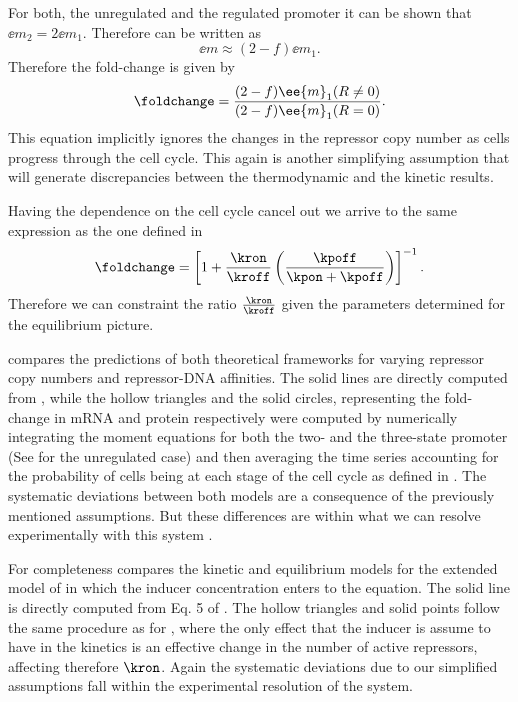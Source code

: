 For both, the unregulated and the regulated promoter it can be shown that
$\ee{m}_2 = 2 \ee{m}_1$. Therefore  can be written
as
\begin{equation}
  \ee{m} \approx (2 - f) \ee{m}_1.
\end{equation}
Therefore the fold-change is given by
\begin{equation}
  \foldchange = {(2 - f) \ee{m}_1(R \neq 0) \over (2 - f) \ee{m}_1(R = 0)}.
\end{equation}
This equation implicitly ignores the changes in the repressor copy number as
cells progress through the cell cycle. This again is another simplifying
assumption that will generate discrepancies between the thermodynamic and the
kinetic results.

Having the dependence on the cell cycle cancel out we arrive to the same
expression as the one defined in 
\begin{equation}
  \foldchange = \left[ 1 + {\kron \over \kroff}
                \left( {\kpoff \over \kpon + \kpoff} \right)\right]^{-1}.
\end{equation}
Therefore we can constraint the ratio ${\kron \over \kroff}$ given the
parameters determined for the equilibrium picture.

 compares the predictions of both theoretical
frameworks for varying repressor copy numbers and repressor-DNA affinities. The
solid lines are directly computed from , while the
hollow triangles and the solid circles, representing the fold-change in mRNA and
protein respectively were computed by numerically integrating the moment
equations for both the two- and the three-state promoter (See
 for the unregulated case) and then averaging the
time series accounting for the probability of cells being at each stage of the
cell cycle as defined in . The systematic deviations between
both models are a consequence of the previously mentioned assumptions. But these
differences are within what we can resolve experimentally with this system
\cite{Garcia2011c, Brewster2014, Barnes2018, Razo-Mejia2018}.

For completeness  compares the kinetic and equilibrium
models for the extended model of \cite{Razo-Mejia2018} in which the inducer
concentration enters to the equation. The solid line is directly computed from
Eq. 5 of \cite{Razo-Mejia2018}. The hollow triangles and solid points follow the
same procedure as for , where the only effect that the
inducer is assume to have in the kinetics is an effective change in the number
of active repressors, affecting therefore $\kron$. Again the systematic
deviations due to our simplified assumptions fall within the experimental
resolution of the system.

